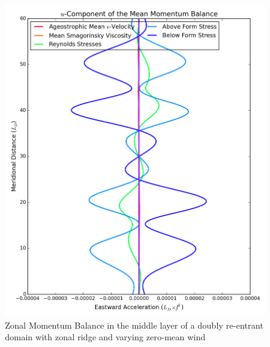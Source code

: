 \documentclass[12pt,a4paper]{report}
\begin{document}
\begin{figure}
\begin{minipage}[b]{0.45\linewidth}
 		\includegraphics[width=\linewidth ]{umom_2}
 		\caption{Zonal Momentum Balance in the middle layer of 
 			a doubly re-entrant domain with 
 			zonal ridge and varying zero-mean wind}
 		\label{fig:umomlayer2}
 	\end{minipage}
 \end{figure}
 
\end{document}
